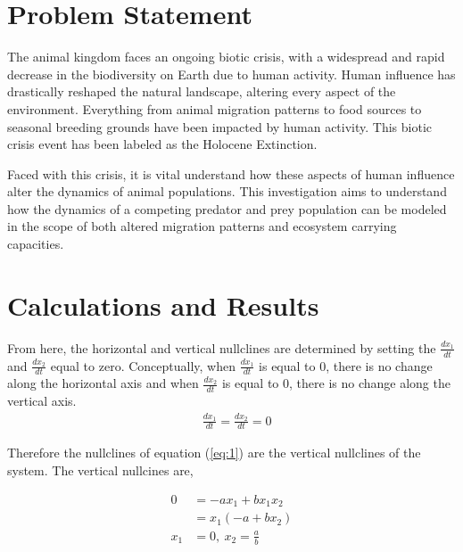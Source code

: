 \documentclass[12pt]{article}   %
\theoremstyle{definition}
\numberwithin{equation}{section}
\begin{document}
\setcounter{page}{3}
\section{Problem Statement} \label{APPM2360proj01sec01}
\quad The animal kingdom faces an ongoing biotic crisis, with a widespread and rapid decrease in the biodiversity on Earth due to human activity. Human influence has drastically reshaped the natural landscape, altering every aspect of the environment. Everything from animal migration patterns to food sources to seasonal breeding grounds have been impacted by human activity. This biotic crisis event has been labeled as the Holocene Extinction.

\quad Faced with this crisis, it is vital understand how these aspects of human influence alter the dynamics of animal populations. This investigation aims to understand how the dynamics of a competing predator and prey population can be modeled in the scope of both altered migration patterns and ecosystem carrying capacities.      

 



\setcounter{page}{3}
\section{Calculations and Results} \label{APPM2360proj01sec01} 

\quad From here, the horizontal and vertical nullclines are determined by setting the $\frac{dx_1}{dt}$ and $\frac{dx_2}{dt}$ equal to zero. Conceptually, when $\frac{dx_1}{dt}$ is equal to 0, there is no change along the horizontal axis and when $\frac{dx_2}{dt}$ is equal to 0, there is no change along the vertical axis. 
\begin{align*}
  & \frac{dx_1}{dt} = \frac{dx_2}{dt} = 0
\end{align*}

\quad Therefore the nullclines of equation (\ref{eq:1}) are the vertical nullclines of the system. The vertical nullcines are,

\begin{align*}
  0 & =  -ax_1 + bx_1x_2 \\
  & = x_1(-a + bx_2) \\
  x_1 &= 0, \ x_2 = \frac{a}{b}  
\end{align*}
\end{document}
